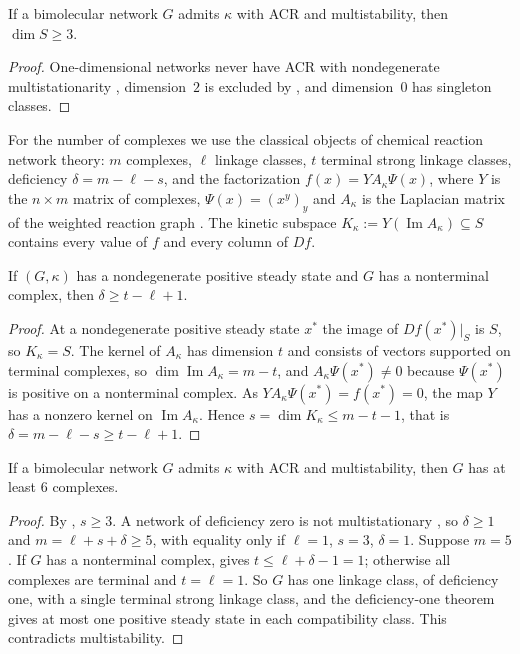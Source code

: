 \documentclass[11pt,a4paper]{report}
\begin{document}
\begin{corollary}[dimension]\label{cor:dimension}
If a bimolecular network $G$ admits $\kappa$ with ACR and multistability, then $\dim S\ge3$.
\end{corollary}

\begin{proof}
One-dimensional networks never have ACR with nondegenerate multistationarity \autocite[Proposition~3.10]{KNS2024},
dimension~$2$ is excluded by , and dimension~$0$ has singleton classes.
\end{proof}

For the number of complexes we use the classical objects of chemical reaction network theory: $m$ complexes, $\ell$
linkage classes, $t$ terminal strong linkage classes, deficiency $\delta=m-\ell-s$, and the factorization
$f(x)=Y A_\kappa \Psi(x)$, where $Y$ is the $n\times m$ matrix of complexes, $\Psi(x)=(x^{y})_y$ and $A_\kappa$ is
the Laplacian matrix of the weighted reaction graph \autocite{Feinberg2019}. The kinetic subspace
$K_\kappa:=Y(\operatorname{Im}A_\kappa)\subseteq S$ contains every value of $f$ and every column of $Df$.

\begin{lemma}\label{lem:kinetic}
If $(G,\kappa)$ has a nondegenerate positive steady state and $G$ has a nonterminal complex, then $\delta\ge
t-\ell+1$.
\end{lemma}

\begin{proof}
At a nondegenerate positive steady state $x^*$ the image of $Df(x^*)|_S$ is $S$, so $K_\kappa=S$. The kernel of
$A_\kappa$ has dimension $t$ and consists of vectors supported on terminal complexes, so
$\dim\operatorname{Im}A_\kappa=m-t$, and $A_\kappa\Psi(x^*)\neq0$ because $\Psi(x^*)$ is positive on a nonterminal
complex. As $YA_\kappa\Psi(x^*)=f(x^*)=0$, the map $Y$ has a nonzero kernel on $\operatorname{Im}A_\kappa$. Hence
$s=\dim K_\kappa\le m-t-1$, that is $\delta=m-\ell-s\ge t-\ell+1$.
\end{proof}

\begin{corollary}[complexes]\label{cor:complexes}
If a bimolecular network $G$ admits $\kappa$ with ACR and multistability, then $G$ has at least $6$ complexes.
\end{corollary}

\begin{proof}
By , $s\ge3$. A network of deficiency zero is not multistationary \autocite[Lemma~2.4]{KNS2024},
so $\delta\ge1$ and $m=\ell+s+\delta\ge5$, with equality only if $\ell=1$, $s=3$, $\delta=1$. Suppose $m=5$. If $G$
has a nonterminal complex,  gives $t\le\ell+\delta-1=1$; otherwise all complexes are terminal and
$t=\ell=1$. So $G$ has one linkage class, of deficiency one, with a single terminal strong linkage class, and the
deficiency-one theorem \autocite{Feinberg1995} gives at most one positive steady state in each compatibility class.
This contradicts multistability.
\end{proof}
\end{document}
